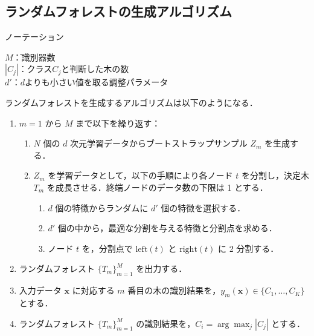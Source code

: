 \documentclass[dvipdfmx]{jreport}
\begin{document}
\subsection{ランダムフォレストの生成アルゴリズム}
\begin{itembox}[l]{\large{ノーテーション}}
    \begin{tabbing}
        \hspace{15pt} \raisebox{0.5ex}{\tiny $\bullet$} $M$\hspace{10pt}\=：識別器数\\[0.5em]
        \hspace{15pt} \raisebox{0.5ex}{\tiny $\bullet$} $|C_j|$\>：クラス$C_j$と判断した木の数\\[0.5em]
        \hspace{15pt} \raisebox{0.5ex}{\tiny $\bullet$} $d'$\>：$d$よりも小さい値を取る調整パラメータ
    \end{tabbing}
\end{itembox}

ランダムフォレストを生成するアルゴリズムは以下のようになる．
\begin{tcolorbox}[title = \textbf{ランダムフォレストの生成アルゴリズム}]
    \begin{enumerate}
        \item $m = 1$ から $M$ まで以下を繰り返す：
            \begin{enumerate}
            \item $N$ 個の $d$ 次元学習データからブートストラップサンプル $Z_m$ を生成する．
            \item $Z_m$ を学習データとして，以下の手順により各ノード $t$ を分割し，決定木 $T_m$ を成長させる．終端ノードのデータ数の下限は 1 とする．
                \begin{enumerate}
                    \item $d$ 個の特徴からランダムに $d'$ 個の特徴を選択する．
                    \item $d'$ 個の中から，最適な分割を与える特徴と分割点を求める．
                    \item ノード $t$ を，分割点で $\mathrm{left}(t)$ と $\mathrm{right}(t)$ に 2 分割する．
                \end{enumerate}
            \end{enumerate}
        \item ランダムフォレスト $\{ T_m \}_{m=1}^M$ を出力する．
        \item 入力データ $\bm{x}$ に対応する $m$ 番目の木の識別結果を，$y_m(\bm{x}) \in \{ C_1, \dots, C_K \}$ とする．
        \item ランダムフォレスト $\{ T_m \}_{m=1}^M$ の識別結果を，$C_i = \arg \max_j |C_j|$ とする．
    \end{enumerate}
\end{tcolorbox}
\end{document}
